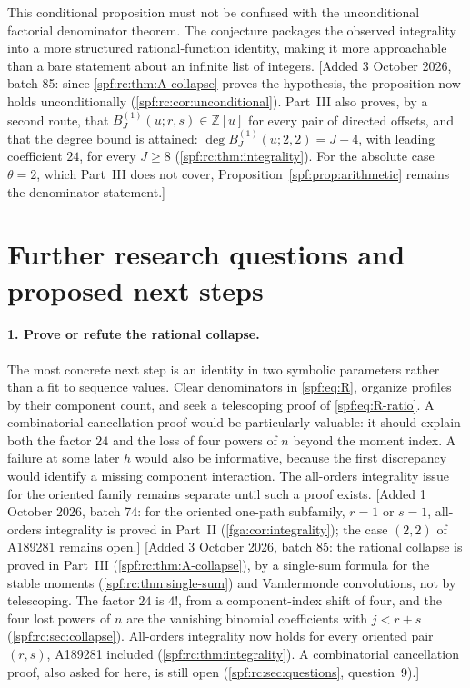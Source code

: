 \documentclass[11pt]{article}
\numberwithin{equation}{section}
\theoremstyle{definition}
\theoremstyle{remark}
\theoremstyle{definition}
\newcommand{\Z}{\mathbb Z}
\begin{document}
This conditional proposition must not be confused with the unconditional
factorial denominator theorem. The conjecture packages the observed
integrality into a more structured rational-function identity, making it
more approachable than a bare statement about an infinite list of integers.
[Added 3 October 2026, batch 85: since \cref{spf:rc:thm:A-collapse} proves
the hypothesis, the proposition now holds unconditionally
(\cref{spf:rc:cor:unconditional}). Part~III also proves, by a second route,
that $B_J^{(1)}(u;r,s)\in\Z[u]$ for every pair of directed offsets, and
that the degree bound is attained: $\deg B_J^{(1)}(u;2,2)=J-4$, with
leading coefficient $24$, for every $J\ge8$
(\cref{spf:rc:thm:integrality}). For the absolute case $\theta=2$, which
Part~III does not cover, Proposition~\ref{spf:prop:arithmetic} remains the
denominator statement.]

\section{Further research questions and proposed next steps}
\label{spf:sec:questions}

\paragraph{1. Prove or refute the rational collapse.}
The most concrete next step is an identity in two symbolic parameters rather
than a fit to sequence values. Clear denominators in \eqref{spf:eq:R}, organize
profiles by their component count, and seek a telescoping proof of
\eqref{spf:eq:R-ratio}. A combinatorial cancellation proof would be particularly
valuable: it should explain both the factor $24$ and the loss of four powers
of $n$ beyond the moment index. A failure at some later $h$ would also be
informative, because the first discrepancy would identify a missing component
interaction. The all-orders integrality issue for the oriented family remains
separate until such a proof exists.
[Added 1 October 2026, batch 74: for the oriented one-path subfamily,
$r=1$ or $s=1$, all-orders integrality is proved in Part~II
(\cref{fga:cor:integrality}); the case $(2,2)$ of A189281 remains open.]
[Added 3 October 2026, batch 85: the rational collapse is proved in
Part~III (\cref{spf:rc:thm:A-collapse}), by a single-sum formula for the
stable moments (\cref{spf:rc:thm:single-sum}) and Vandermonde
convolutions, not by telescoping. The factor $24$ is $4!$, from a
component-index shift of four, and the four lost powers of $n$ are the
vanishing binomial coefficients with $j<r+s$
(\cref{spf:rc:sec:collapse}). All-orders integrality now holds for every
oriented pair $(r,s)$, A189281 included (\cref{spf:rc:thm:integrality}).
A combinatorial cancellation proof, also asked for here, is still open
(\cref{spf:rc:sec:questions}, question~9).]
\end{document}
